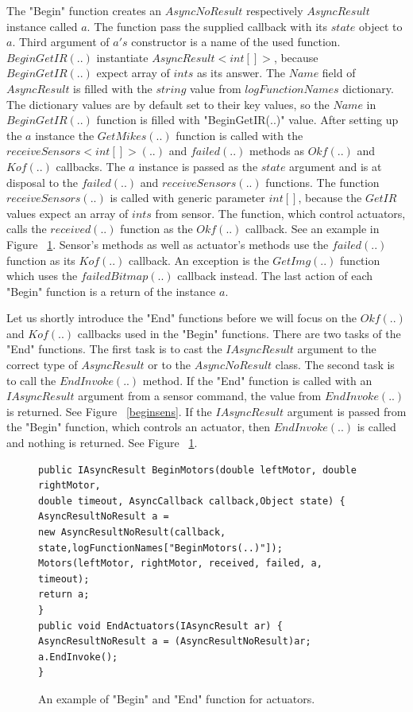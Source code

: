   The "Begin" function creates an $AsyncNoResult$ respectively $AsyncResult$ instance called $a$. 
  The function pass the supplied callback with its $state$ object to
  $a$. Third argument of $a's$ constructor is a name of the used function.
  $BeginGetIR(..)$ instantiate $AsyncResult<int[]>$, because $BeginGetIR(..)$
  expect array of $ints$ as its answer. 
  The $Name$ field of $AsyncResult$ is filled with the $string$ value from $logFunctionNames$ dictionary. 
  The dictionary values are by default set to their key values, so
  the $Name$ in $BeginGetIR(..)$ function is filled with "BeginGetIR(..)" value.
  After setting up the $a$ instance the $GetMikes(..)$ function is called with the $receiveSensors<int[]>(..)$ and 
  $failed(..)$ methods as $Okf(..)$ and $Kof(..)$ callbacks.
  The $a$ instance is passed as the $state$ argument and is at disposal to the $failed(..)$ and 
  $receiveSensors(..)$ functions.
  The function $receiveSensors(..)$ is called with generic parameter $int[]$, 
  because the $GetIR$ values expect an array of $ints$ from sensor.
  The function, which control actuators, calls the $received(..)$ function as the $Okf(..)$ callback. 
  See an example in Figure ~\ref{beginact}.
  Sensor's methods as well as actuator's methods use the $failed(..)$ function as its $Kof(..)$ callback.
  An exception is the $GetImg(..)$ function which uses the $failedBitmap(..)$ callback instead.
  The last action of each "Begin" function is a return of the instance $a$.

  Let us shortly introduce the "End" functions before we will focus on the $Okf(..)$ and 
  $Kof(..)$ callbacks used in the "Begin" functions.
  There are two tasks of the "End" functions.
  The first task  is to cast the $IAsyncResult$ argument to the correct type of $AsyncResult$ 
  or to the $AsyncNoResult$ class. The second task is to call the $EndInvoke(..)$ method.
  If the "End" function is called with an $IAsyncResult$ argument from a sensor command, 
  the value from $EndInvoke(..)$ is returned. See Figure ~\ref{beginsens}. 
  If the $IAsyncResult$ argument is passed from the "Begin" function, 
  which controls an actuator, then $EndInvoke(..)$ is called and nothing is returned. See Figure ~\ref{beginact}.
  
\begin{figure}[!hbp]
\begin{lstlisting}
public IAsyncResult BeginMotors(double leftMotor, double rightMotor, 
double timeout, AsyncCallback callback,Object state) {
AsyncResultNoResult a = 
new AsyncResultNoResult(callback, state,logFunctionNames["BeginMotors(..)"]);
Motors(leftMotor, rightMotor, received, failed, a, timeout);
return a;
}
public void EndActuators(IAsyncResult ar) {
AsyncResultNoResult a = (AsyncResultNoResult)ar;
a.EndInvoke();
}
\end{lstlisting}	
\caption{An example of "Begin" and "End" function for actuators.} \label{beginact}
\end{figure}
  
